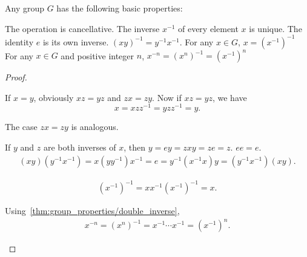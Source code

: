 \begin{proposition}\label{thm:group_properties}
  Any group \( G \) has the following basic properties:
  \begin{defenum}
     The operation is cancellative.
     The inverse \( x^{-1} \) of every element \( x \) is unique.
     The identity \( e \) is its own inverse.
     \( (xy)^{-1} = y^{-1} x^{-1} \).
     For any \( x \in G \), \( x = (x^{-1})^{-1} \)
     For any \( x \in G \) and positive integer \( n \), \( x^{-n} = (x^n)^{-1} = (x^{-1})^n \)
  \end{defenum}
\end{proposition}
\begin{proof}\mbox{}
  \begin{itemize}
     If \( x = y \), obviously \( xz = yz \) and \( zx = zy \). Now if \( xz = yz \), we have
    \begin{equation*}
      x = xzz^{-1} = yzz^{-1} = y.
    \end{equation*}

    The case \( zx = zy \) is analogous.

     If \( y \) and \( z \) are both inverses of \( x \), then \( y = ey = zxy = ze = z \).
     \( ee = e \).
    \begin{align*}
      (xy) (y^{-1} x^{-1})
      =
      x (y y^{-1}) x^{-1}
      =
      e
      =
      y^{-1} (x^{-1} x) y
      =
      (y^{-1} x^{-1}) (xy).
    \end{align*}

    \begin{align*}
      (x^{-1})^{-1}
      =
      x x^{-1} (x^{-1})^{-1}
      =
      x.
    \end{align*}

     Using~\ref{thm:group_properties/double_inverse},
    \begin{align*}
      x^{-n}
      =
      (x^n)^{-1}
      =
      x^{-1} \cdots x^{-1}
      =
      (x^{-1})^n.
    \end{align*}
  \end{itemize}
\end{proof}

